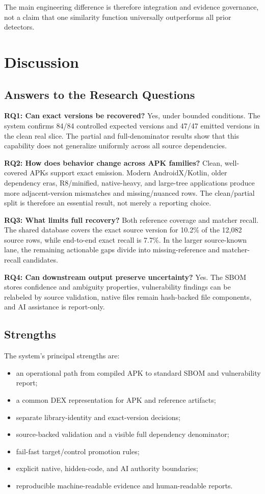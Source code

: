 The main engineering difference is therefore integration and evidence
governance, not a claim that one similarity function universally outperforms
all prior detectors.

\section{Discussion}

\subsection{Answers to the Research Questions}

\textbf{RQ1: Can exact versions be recovered?} Yes, under bounded conditions.
The system confirms 84/84 controlled expected versions and 47/47 emitted
versions in the clean real slice. The partial and full-denominator results
show that this capability does not generalize uniformly across all source
dependencies.

\textbf{RQ2: How does behavior change across APK families?} Clean,
well-covered APKs support exact emission. Modern AndroidX/Kotlin, older
dependency eras, R8/minified, native-heavy, and large-tree applications
produce more adjacent-version mismatches and missing/nuanced rows. The
clean/partial split is therefore an essential result, not merely a reporting
choice.

\textbf{RQ3: What limits full recovery?} Both reference coverage and matcher
recall. The shared database covers the exact source version for 10.2\% of the
12,082 source rows, while end-to-end exact recall is 7.7\%. In the larger
source-known lane, the remaining actionable gaps divide into missing-reference
and matcher-recall candidates.

\textbf{RQ4: Can downstream output preserve uncertainty?} Yes. The SBOM stores
confidence and ambiguity properties, vulnerability findings can be relabeled
by source validation, native files remain hash-backed file components, and AI
assistance is report-only.

\subsection{Strengths}

The system's principal strengths are:

\begin{itemize}
  \item an operational path from compiled APK to standard SBOM and
  vulnerability report;
  \item a common DEX representation for APK and reference artifacts;
  \item separate library-identity and exact-version decisions;
  \item source-backed validation and a visible full dependency denominator;
  \item fail-fast target/control promotion rules;
  \item explicit native, hidden-code, and AI authority boundaries;
  \item reproducible machine-readable evidence and human-readable reports.
\end{itemize}


